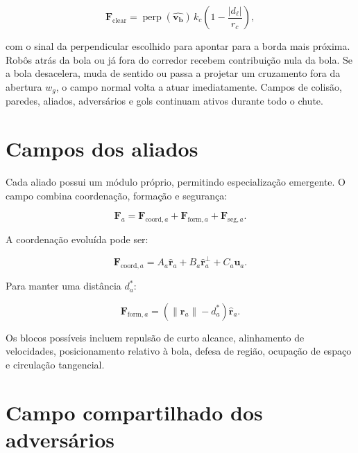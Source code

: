 \documentclass[12pt,a4paper]{article}
\newcommand{\vect}[1]{\boldsymbol{#1}}
\newcommand{\unit}[1]{\widehat{\vect{#1}}}
\begin{document}
\begin{equation}
  \vect F_{\mathrm{clear}}=\operatorname{perp}(\unit{\vect v_b})\,
  k_c\left(1-\frac{|d_\ell|}{r_c}\right),
\end{equation}

com o sinal da perpendicular escolhido para apontar para a borda mais pr\'oxima.
Rob\^os atr\'as da bola ou j\'a fora do corredor recebem
contribui\c{c}\~ao nula da bola. Se a bola desacelera, muda de sentido ou passa a
projetar um cruzamento fora da abertura $w_g$, o campo normal volta a atuar
imediatamente. Campos de colis\~ao, paredes, aliados, advers\'arios e gols
continuam ativos durante todo o chute.

\section{Campos dos aliados}

Cada aliado possui um m\'odulo pr\'oprio, permitindo especializa\c{c}\~ao emergente. O campo combina coordena\c{c}\~ao, forma\c{c}\~ao e seguran\c{c}a:

\begin{equation}
  \vect{F}_a=\vect{F}_{\mathrm{coord},a}+\vect{F}_{\mathrm{form},a}+\vect{F}_{\mathrm{seg},a}.
\end{equation}

A coordena\c{c}\~ao evolu\'ida pode ser:

\begin{equation}
  \vect{F}_{\mathrm{coord},a}=A_a\unit{r}_a+B_a\unit{r}_a^\perp+C_a\vect{u}_a.
\end{equation}

Para manter uma dist\^ancia $d_a^*$:

\begin{equation}
  \vect{F}_{\mathrm{form},a}=(\|\vect{r}_a\|-d_a^*)\unit{r}_a.
\end{equation}

Os blocos poss\'iveis incluem repuls\~ao de curto alcance, alinhamento de velocidades, posicionamento relativo \`a bola, defesa de regi\~ao, ocupa\c{c}\~ao de espa\c{c}o e circula\c{c}\~ao tangencial.

\section{Campo compartilhado dos advers\'arios}
\end{document}
